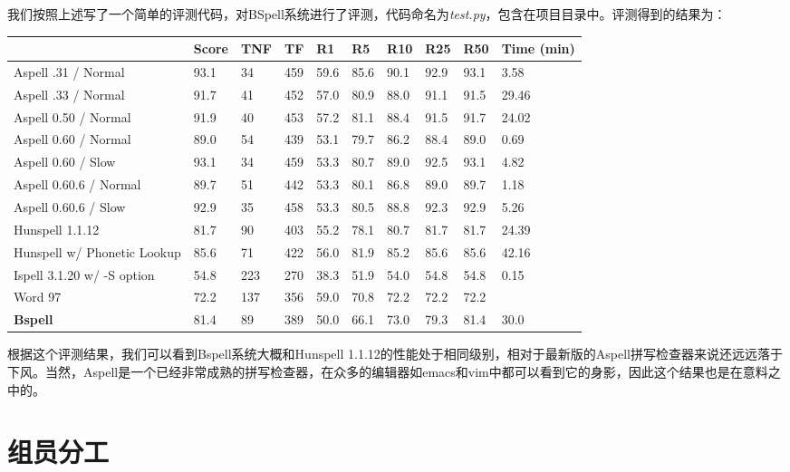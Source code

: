 \documentclass[UTF8,a4paper]{ctexart}
\begin{document}
我们按照上述写了一个简单的评测代码，对BSpell系统进行了评测，代码命名为\textit{test.py}，包含在项目目录中。评测得到的结果为：

\begin{table}[hbp]
\centering
    \begin{tabular}{|l|l|l|l|l|l|l|l|l|l|}
    \hline
		~ & Score & TNF & TF & R1 & R5 & R10 & R25 & R50 & Time (min) \\
		\hline
		Aspell .31 / Normal & 93.1 &34 & 459 &59.6 & 85.6 & 90.1 & 92.9 & 93.1 & 3.58 \\
		\hline
		Aspell .33 / Normal		&91.7	&41			&452		&57.0	&80.9	&88.0	&91.1	&91.5 & 29.46 \\
		\hline
		Aspell 0.50 / Normal		&91.9	&40			&453		&57.2	&81.1	&88.4	&91.5	&91.7 & 24.02 \\
		\hline
		Aspell 0.60 / Normal		&89.0	&54			&439		&53.1	&79.7	&86.2	&88.4	&89.0 & 0.69 \\
		\hline
		Aspell 0.60 / Slow		&93.1	&34			&459		&53.3	&80.7	&89.0	&92.5	&93.1 & 4.82 \\
		\hline
		Aspell 0.60.6 / Normal		&89.7	&51			&442		&53.3	&80.1	&86.8	&89.0	&89.7 & 1.18 \\
		\hline
		Aspell 0.60.6 / Slow		&92.9	&35			&458		&53.3	&80.5	&88.8	&92.3	&92.9 & 5.26 \\
		\hline
		Hunspell 1.1.12			&81.7	&90			&403		&55.2	&78.1	&80.7	&81.7	&81.7 & 24.39 \\
		\hline
		Hunspell w/ Phonetic Lookup	&85.6	&71			&422		&56.0	&81.9	&85.2	&85.6	&85.6 & 42.16 \\
		\hline
		Ispell 3.1.20 w/ -S option	&54.8	&223			&270		&38.3	&51.9	&54.0	&54.8	&54.8 & 0.15 \\
		\hline
		Word 97				&72.2	&137			&356		&59.0	&70.8	&72.2	&72.2	&72.2  & ~ \\
		\hline
		\textbf{Bspell}	 &	81.4 & 89 & 389 & 50.0 & 66.1 & 73.0 & 79.3 & 81.4 & 30.0 \\
		\hline
    \end{tabular}
\end{table}

根据这个评测结果，我们可以看到Bspell系统大概和Hunspell 1.1.12的性能处于相同级别，相对于最新版的Aspell拼写检查器来说还远远落于下风。当然，Aspell是一个已经非常成熟的拼写检查器，在众多的编辑器如emacs和vim中都可以看到它的身影，因此这个结果也是在意料之中的。

\section{组员分工}
\end{document}
